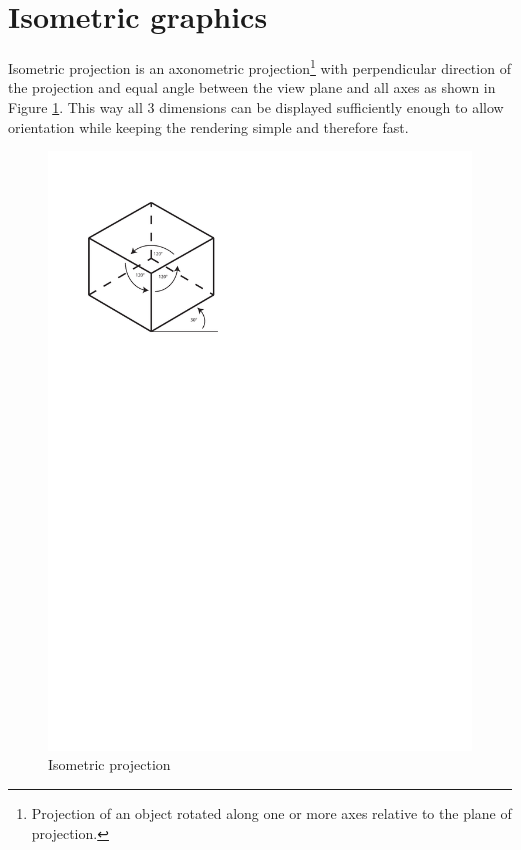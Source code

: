 \documentclass[11pt,oneside, final]{fithesis2}
\begin{document}
\section{Isometric graphics}
Isometric projection is an axonometric projection\footnote{Projection of an object rotated along one or more axes relative to the plane of projection\cite{maynard}.} with perpendicular direction of the projection and equal angle between the view plane and all axes\cite{desai} as shown in Figure \ref{isometric}. This way all 3 dimensions can be displayed sufficiently enough to allow orientation while keeping the rendering simple and therefore fast. 

\begin{figure}[h]
	\centering
	\includegraphics[clip=true,trim=0 205mm 100mm 20mm]{thesis-isobox}
	\caption{Isometric projection}
	\label{isometric}
\end{figure}
\end{document}
